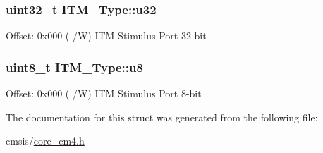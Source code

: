 \subsubsection[{\texorpdfstring{u32}{u32}}]{ uint32\+\_\+t I\+T\+M\+\_\+\+Type\+::u32}\hypertarget{struct_i_t_m___type_a6882fa5af67ef5c5dfb433b3b68939df}{}\label{struct_i_t_m___type_a6882fa5af67ef5c5dfb433b3b68939df}
Offset\+: 0x000 ( /W) I\+TM Stimulus Port 32-\/bit 
\subsubsection[{\texorpdfstring{u8}{u8}}]{ uint8\+\_\+t I\+T\+M\+\_\+\+Type\+::u8}\hypertarget{struct_i_t_m___type_abea77b06775d325e5f6f46203f582433}{}\label{struct_i_t_m___type_abea77b06775d325e5f6f46203f582433}
Offset\+: 0x000 ( /W) I\+TM Stimulus Port 8-\/bit 

The documentation for this struct was generated from the following file\+:\begin{DoxyCompactItemize}
\item 
cmsis/\hyperlink{core__cm4_8h}{core\+\_\+cm4.\+h}\end{DoxyCompactItemize}
